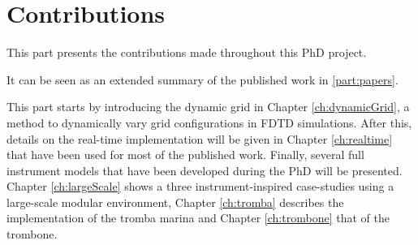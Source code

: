 \chapter*{Contributions}
This part presents the contributions made throughout this PhD project.

It can be seen as an extended summary of the published work in \ref{part:papers}.

This part starts by introducing the dynamic grid in Chapter \ref{ch:dynamicGrid}, a method to dynamically vary grid configurations in FDTD simulations. After this, details on the real-time implementation will be given in Chapter \ref{ch:realtime} that have been used for most of the published work. 
Finally, several full instrument models that have been developed during the PhD will be presented. Chapter \ref{ch:largeScale} shows a three instrument-inspired case-studies using a large-scale modular environment, Chapter \ref{ch:tromba} describes the implementation of the tromba marina and Chapter \ref{ch:trombone} that of the trombone.

